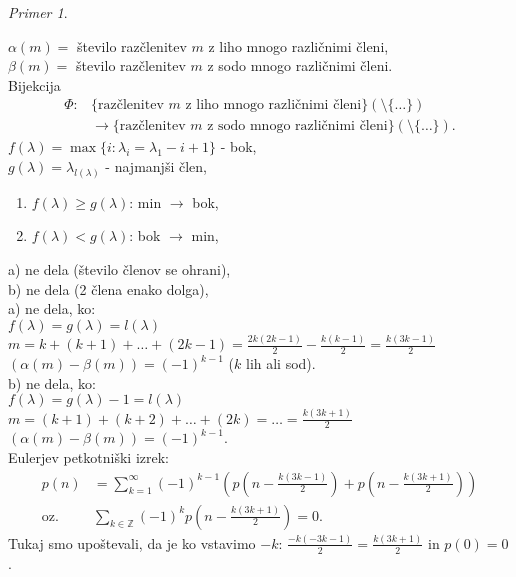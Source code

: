 \documentclass[a4paper, 12pt]{book}
\theoremstyle{definition}
\theoremstyle{remark}
\newtheorem*{ex}{Primer}
\newcommand{\Z}{\mathbb{Z}}
\begin{document}
\begin{ex}
\begin{enumerate}[label=(\arabic{*})]
      $\alpha(m) = $ število razčlenitev $m$ z liho mnogo različnimi členi, \\
      $\beta(m) = $ število razčlenitev $m$ z sodo mnogo različnimi členi. \\
      Bijekcija
      \begin{align*}
        \Phi: & \{\text{razčlenitev }m \text{ z liho mnogo različnimi členi}\} (\setminus \{\dots\}) \\
        &\to \{\text{razčlenitev }m \text{ z sodo mnogo različnimi členi}\} (\setminus \{\dots\}).
      \end{align*}
      $f(\lambda) = \max \{i: \lambda_i = \lambda_1 - i + 1\}$ - bok, \\
      $g(\lambda) = \lambda_{l(\lambda)}$ - najmanjši člen,
      \begin{enumerate}[label={\alph*)}]
        \item $f(\lambda) \geq g(\lambda)$: min $\to$ bok,
        \item $f(\lambda) < g(\lambda)$: bok $\to$ min,
      \end{enumerate}
      a) ne dela (število členov se ohrani), \\ %
      b) ne dela (2 člena enako dolga), \\ %
      a) ne dela, ko: \\ %
      $f(\lambda) = g(\lambda) = l(\lambda)$ \\
      $m = k + (k+1) + \dots + (2k-1) = \frac{2k(2k-1)}{2} - \frac{k(k-1)}{2} = \frac{k(3k-1)}{2}$ \\
      $(\alpha(m) - \beta(m)) = (-1)^{k-1}$ ($k$ lih ali sod). \\
      b) ne dela, ko: \\ %
      $f(\lambda) = g(\lambda) - 1 = l(\lambda)$ \\
      $m = (k+1) + (k+2) + \dots + (2k) = \dots = \frac{k(3k+1)}{2}$ \\
      $(\alpha(m) - \beta(m)) = (-1)^{k-1}$. \\
      Eulerjev petkotniški izrek:
      \begin{align*}
        p(n) &= \sum_{k=1}^{\infty} (-1)^{k-1} \left(p\left(n-\frac{k(3k-1)}{2}\right) + p\left(n-\frac{k(3k+1)}{2}\right)\right) \\
        \text{oz.} & \sum_{k \in \Z} (-1)^k p\left(n - \frac{k(3k+1)}{2}\right) = 0.
      \end{align*}
      Tukaj smo upoštevali, da je ko vstavimo $-k$: $\frac{-k(-3k-1)}{2} = \frac{k(3k+1)}{2}$ in $p(0) = 0$.
  \end{enumerate}
\end{ex}
\end{document}
